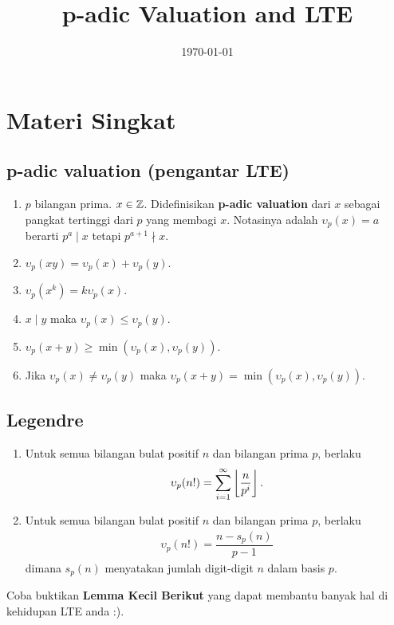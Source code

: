 \documentclass[11pt]{scrartcl}
\title{p-adic Valuation and LTE}
\date{\today}
\begin{document}
\maketitle

\section{Materi Singkat}
\subsection{p-adic valuation (pengantar LTE)}
\begin{enumerate}
    \item $p$ bilangan prima. $x \in \mathbb Z$. Didefinisikan \textbf{p-adic valuation} dari $x$ sebagai pangkat tertinggi dari $p$ yang membagi $x$. Notasinya adalah $\upsilon_p(x)=a$ berarti $p^a \mid x$ tetapi $p^{a+1} \nmid x$.
    \item $\upsilon_p(xy) = \upsilon_p(x) + \upsilon_p(y)$.
    \item $\upsilon_p(x^k)=k\upsilon_p(x)$.
    \item $x \mid y$ maka $\upsilon_p(x) \le \upsilon_p(y)$.
    \item $\upsilon_p(x+y) \ge \min(\upsilon_p(x),\upsilon_p(y))$.
    \item Jika $\upsilon_p(x) \neq \upsilon_p(y)$ maka $\upsilon_p(x+y) = \min(\upsilon_p(x),\upsilon_p(y))$.
\end{enumerate}

\subsection{Legendre}
\begin{enumerate}
    \item Untuk semua bilangan bulat positif $n$ dan bilangan prima $p$, berlaku
\begin{align*}
    \upsilon_p(n!) = \sum_{i=1}^{\infty} \left\lfloor \frac{n}{p^i} \right\rfloor.
\end{align*}

    \item Untuk semua bilangan bulat positif $n$ dan bilangan prima $p$, berlaku
\begin{align*}
    \upsilon_p(n!) = \dfrac{n-s_p(n)}{p-1}
\end{align*}
    dimana $s_p(n)$ menyatakan jumlah digit-digit $n$ dalam basis $p$.
\end{enumerate}

Coba buktikan \textbf{Lemma Kecil Berikut} yang dapat membantu banyak hal di kehidupan LTE anda :).
\end{document}
